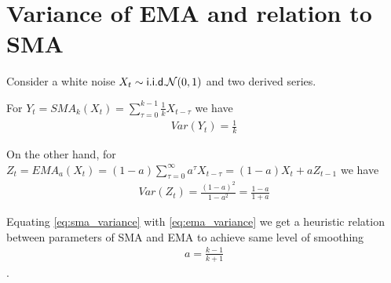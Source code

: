 \section{Variance of EMA and relation to SMA}
Consider a white noise $X_t \sim \mathsf {i.i.d.} \mathcal{N}(0, 1)$ and two derived series.

For $Y_t = SMA_k(X_t) = \sum _{\tau=0}^{k-1} \frac{1}{k}X_{t-\tau}$ we have 
\begin{align}
	Var(Y_t) = \frac{1}{k} \label{eq:sma_variance}
\end{align}

On the other hand, for $Z_t = EMA_a(X_t) = (1-a)\sum_{\tau=0}^{\infty} a^{\tau} X_{t-\tau} = (1-a) X_t + a Z_{t-1}$ we have 
\begin{align}
Var(Z_t) = \frac{(1-a)^2}{1-a^2} = \frac{1-a}{1+a}	\label{eq:ema_variance}
\end{align}

Equating \autoref{eq:sma_variance} with \autoref{eq:ema_variance} we get a heuristic relation between parameters of SMA and EMA to achieve same level of smoothing
\begin{align} 
\boxed{a = \frac{k-1}{k+1}}
\end{align}.
